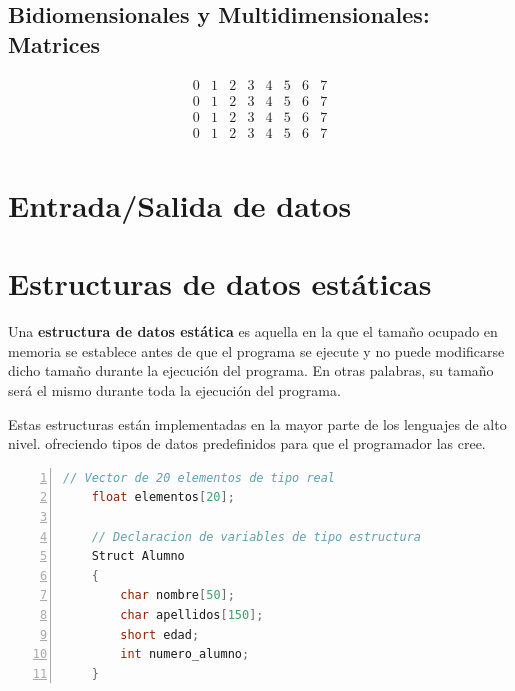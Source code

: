 \documentclass[a4paper, 11pt, titlepage]{article}
\begin{document}
    \subsection{Bidiomensionales y Multidimensionales: Matrices}
    
        \begin{equation}
            \begin{matrix} 
            0 & 1 & 2 & 3 & 4 & 5 & 6 & 7 \\
            0 & 1 & 2 & 3 & 4 & 5 & 6 & 7 \\
            0 & 1 & 2 & 3 & 4 & 5 & 6 & 7 \\
            0 & 1 & 2 & 3 & 4 & 5 & 6 & 7 \\
            \end{matrix} 
        \end{equation}


\section{Entrada/Salida de datos}


\section{Estructuras de datos estáticas}

    Una \textbf{estructura de datos estática} es aquella en la que el tamaño ocupado en memoria se
    establece antes de que el programa se ejecute y no puede modificarse dicho tamaño durante
    la ejecución del programa. En otras palabras, su tamaño será el mismo durante toda la ejecución
    del programa.

    Estas estructuras están implementadas en la mayor parte de los lenguajes de alto nivel. ofreciendo
    tipos de datos predefinidos para que el programador las cree.

    \begin{lstlisting}[language=C,numbers=left]
    // Vector de 20 elementos de tipo real
    float elementos[20];

    // Declaracion de variables de tipo estructura
    Struct Alumno
    {
        char nombre[50];
        char apellidos[150];
        short edad;
        int numero_alumno;
    }\end{lstlisting}
\end{document}
